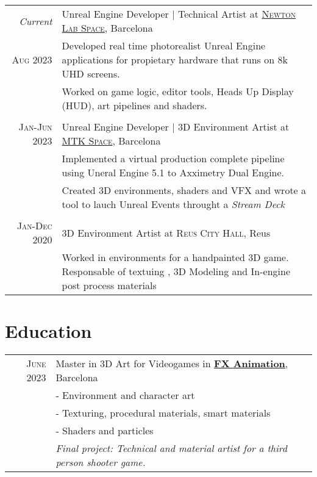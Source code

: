 \documentclass[a4paper,10pt]{article} %
\begin{document}
\begin{tabular}{r|p{11cm}}
\emph{Current} &  Unreal Engine Developer | Technical Artist at \href{https://www.newtonlabspace.com}{\textsc{Newton Lab Space}}, Barcelona \\
\textsc{Aug 2023} & \footnotesize{Developed real time photorealist Unreal Engine applications for propietary hardware that runs on 8k UHD screens.}\\
& \footnotesize{Worked on game logic, editor tools, Heads Up Display (HUD), art pipelines and shaders.}\\
\multicolumn{2}{c}{} \\


\textsc{Jan-Jun 2023} & Unreal Engine Developer | 3D Environment Artist at \href{https://mtkspace.com/home/}{\textsc{MTK Space}}, Barcelona \emph{}\\
& \footnotesize{Implemented a virtual production complete pipeline using Uneral Engine 5.1 to Axximetry Dual Engine.}\\
& \footnotesize{Created 3D environments, shaders and VFX and wrote a tool to lauch Unreal Events throught a \textit{Stream Deck}}\\
\multicolumn{2}{c}{} \\


\textsc{Jan-Dec 2020} & 3D Environment Artist at \textsc{Reus City Hall}, Reus \emph{}\\
& \footnotesize{Worked in environments for a handpainted 3D game. Responsable of textuing , 3D Modeling and In-engine post process materials}
\end{tabular}


\section{Education}

\begin{tabular}{rl}	
\textsc{June} 2023 & Master in 3D Art for Videogames in \href{https://www.fxbarcelonafilmschool.com/}{\textbf{FX Animation}}, Barcelona\\
& \footnotesize{- Environment and character art}\\
& \footnotesize{- Texturing, procedural materials, smart materials}\\
& \footnotesize{- Shaders and particles}\\
& \emph{Final project: Technical and material artist for a third person shooter game.}\\
\end{tabular}
\end{document}
